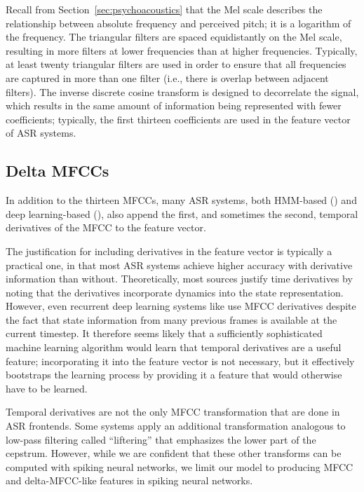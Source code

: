 Recall from Section~\ref{sec:psychoacoustics}
that the Mel scale
describes the relationship between
absolute frequency and perceived pitch;
it is a logarithm of the frequency.
The triangular filters are spaced
equidistantly on the Mel scale,
resulting in more filters
at lower frequencies than at higher frequencies.
Typically, at least twenty triangular filters
are used in order to ensure that all frequencies
are captured in more than one filter
(i.e., there is overlap between adjacent filters).
The inverse discrete cosine transform
is designed to decorrelate the signal,
which results in the same amount
of information being represented
with fewer coefficients;
typically, the first thirteen coefficients
are used in the feature vector
of ASR systems.

\subsection{Delta MFCCs}

In addition to the thirteen MFCCs,
many ASR systems,
both HMM-based (\cite{hain1999,gales2008})
and deep learning-based
(\cite{graves2006,graves2008,fernandez2008}),
also append the first,
and sometimes the second,
temporal derivatives of the MFCC
to the feature vector.

The justification for including derivatives
in the feature vector is typically
a practical one,
in that most ASR systems
achieve higher accuracy with
derivative information than without.
Theoretically,
most sources justify time derivatives
by noting that the derivatives
incorporate dynamics into the state representation.
However,
even recurrent deep learning systems
like \cite{graves2008}
use MFCC derivatives
despite the fact that
state information from many previous frames
is available at the current timestep.
It therefore seems likely that
a sufficiently sophisticated machine learning algorithm
would learn that temporal derivatives
are a useful feature;
incorporating it into the feature vector
is not necessary,
but it effectively bootstraps the learning process
by providing it a feature
that would otherwise
have to be learned.

Temporal derivatives are not the only
MFCC transformation that are done in ASR frontends.
Some systems apply an additional transformation
analogous to low-pass filtering
called ``liftering'' that emphasizes
the lower part of the cepstrum.
However, while we are confident
that these other transforms
can be computed with spiking neural networks,
we limit our model to producing
MFCC and delta-MFCC-like features
in spiking neural networks.

